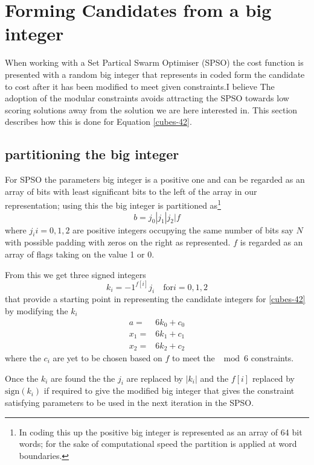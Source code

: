 \documentclass[a4paper,oneside,english]{article}
\numberwithin{equation}{section}
\numberwithin{figure}{section}
\numberwithin{table}{section}
\begin{document}
\section{Forming Candidates from a big integer  }
When working with a Set Partical Swarm Optimiser (SPSO) the cost function is presented with a random big integer that represents in coded form the candidate to cost after it has been modified to meet given constraints.I believe The adoption of the modular constraints avoids attracting the SPSO towards low scoring solutions away from the solution we are here interested in. This section describes how this is done for  Equation \ref{cubes-42}.

\subsection{partitioning the big integer} 
For  SPSO the parameters big integer is a positive one and can be regarded as an array of bits with least significant bits to the left of the array in our representation; using this the big integer is partitioned as\footnote{In coding this up the positive big integer is represented as an array of 64 bit words; for the sake of computational speed the partition is applied at word boundaries. }
\begin{equation}\label{big-int}
b=j_0|j_1|j_2|f
\end{equation}
where $j_i i=0,1,2$ are positive integers occupying the same number of bits say $N$ with possible padding with zeros on the right as represented. $f$ is regarded as an array of flags taking on the value 1 or 0.

From this we get three signed integers
\begin{equation}\label{sighed-int}
k_i=-1^{f[i]} j_i \quad \mathrm{for} i=0,1,2
\end{equation}  
that provide a starting point in representing the candidate integers for \ref{cubes-42} by modifying the $k_i$
\begin{align}
a = &6 k_0 +c_0\\
x_1= &6 k_1+c_1\\
x_2= &6 k_2+c_2
\end{align}
where the $c_i$ are yet to be chosen based on $f$ to meet the $\mod 6$ constraints.

Once the $k_i$ are found the the $j_i$ are replaced by $|k_i|$ and the $f[i]$ replaced by $\mathrm{sign}(k_i)$ if required to give the modified big integer that gives the constraint satisfying parameters to be used in the next iteration in the SPSO.
\end{document}
